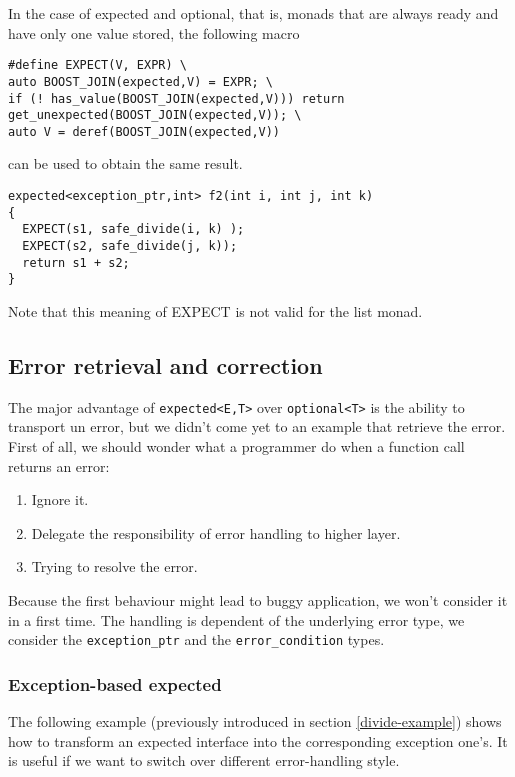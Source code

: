 \documentclass[a4paper,10pt]{article}
\newcommand{\cpp}[1]{\lstinline{#1}}
\begin{document}
In the case of expected and optional, that is, monads that are always ready and have only one value stored, the following macro 

\begin{lstlisting}
#define EXPECT(V, EXPR) \
auto BOOST_JOIN(expected,V) = EXPR; \
if (! has_value(BOOST_JOIN(expected,V))) return get_unexpected(BOOST_JOIN(expected,V)); \
auto V = deref(BOOST_JOIN(expected,V))
\end{lstlisting}

can be used to obtain the same result.

\begin{lstlisting}
expected<exception_ptr,int> f2(int i, int j, int k)
{
  EXPECT(s1, safe_divide(i, k) );
  EXPECT(s2, safe_divide(j, k));
  return s1 + s2;
}
\end{lstlisting}

Note that this meaning of EXPECT is not valid for the list monad. 

\subsection{Error retrieval and correction}

The major advantage of \cpp{expected<E,T>} over \cpp{optional<T>} is the ability to transport un error, but we didn't come yet to an example that retrieve the error. First of all, we should wonder what a programmer do when a function call returns an error:

\begin{enumerate}
 \item Ignore it.
 \item Delegate the responsibility of error handling to higher layer.
 \item Trying to resolve the error.
\end{enumerate}

Because the first behaviour might lead to buggy application, we won't consider it in a first time. The handling is dependent of the underlying error type, we consider the \cpp{exception_ptr} and the \cpp{error_condition} types.

\subsubsection{Exception-based expected}
\label{exception-based-expected}

The following example (previously introduced in section \ref{divide-example}) shows how to transform an expected interface into the corresponding exception one's. It is useful if we want to switch over different error-handling style.
\end{document}
